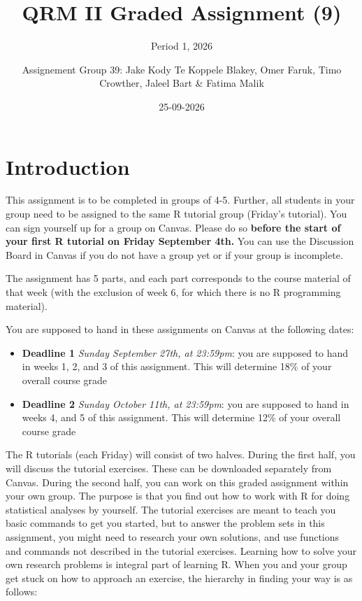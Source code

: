 \documentclass[
]{article}
\title{QRM II Graded Assignment (9)}
\subtitle{Period 1, 2026}
\author{Assignement Group 39: Jake Kody Te Koppele Blakey, Omer Faruk,
Timo Crowther, Jaleel Bart \& Fatima Malik}
\date{25-09-2026}
\providecommand{\tightlist}{%
  \setlength{\itemsep}{0pt}\setlength{\parskip}{0pt}}
\begin{document}
\maketitle

\section{Introduction}\label{introduction}

This assignment is to be completed in groups of 4-5. Further, all
students in your group need to be assigned to the same R tutorial group
(Friday's tutorial). You can sign yourself up for a group on Canvas.
Please do so
\textbf{before the start of your first R tutorial on Friday September 4th.}
You can use the Discussion Board in Canvas if you do not have a group
yet or if your group is incomplete.

The assignment has 5 parts, and each part corresponds to the course
material of that week (with the exclusion of week 6, for which there is
no R programming material).

You are supposed to hand in these assignments on Canvas at the following
dates:

\begin{itemize}
\tightlist
\item
  \textbf{Deadline 1} \emph{Sunday September 27th, at 23:59pm}: you are
  supposed to hand in weeks 1, 2, and 3 of this assignment. This will
  determine 18\% of your overall course grade
\item
  \textbf{Deadline 2} \emph{Sunday October 11th, at 23:59pm}: you are
  supposed to hand in weeks 4, and 5 of this assignment. This will
  determine 12\% of your overall course grade
\end{itemize}

The R tutorials (each Friday) will consist of two halves. During the
first half, you will discuss the tutorial exercises. These can be
downloaded separately from Canvas. During the second half, you can work
on this graded assignment within your own group. The purpose is that you
find out how to work with R for doing statistical analyses by yourself.
The tutorial exercises are meant to teach you basic commands to get you
started, but to answer the problem sets in this assignment, you might
need to research your own solutions, and use functions and commands not
described in the tutorial exercises. Learning how to solve your own
research problems is integral part of learning R. When you and your
group get stuck on how to approach an exercise, the hierarchy in finding
your way is as follows:
\end{document}
